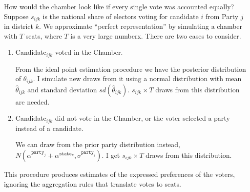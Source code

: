 How would the chamber look like if every single vote was accounted equally? Suppose $s_{ijk}$ is the national share of  electors voting for candidate $i$ from Party $j$ in district $k$.  We approximate  ``perfect representation'' by simulating a chamber with $T$ seats, where $T$ is a very large numberx. There are two cases to consider. 

\begin{enumerate}
\item Candidate$_{ijk}$ voted in the Chamber. 
  
From the ideal point estimation procedure we have the posterior distribution of $\theta_{ijk}$. I simulate new draws from it using a normal distribution with mean $\hat \theta_{ijk}$ and standard deviation $sd(\hat\theta_{ijk})$. $s_{ijk}\times T$ draws from this distribution are needed.

\item Candidate$_{ijk}$ did not vote in the Chamber, or the voter selected a party instead of a candidate. 

We can draw from the prior party distribution instead, $N(\alpha^{\mathtt{party_j}}+\alpha^{\mathtt{state}_k},\sigma^{\mathtt{party}_j})$.  I get $s_{ijk} \times T$ draws from this distribution.
\end{enumerate}

This procedure produces estimates of the expressed preferences of the voters, ignoring the aggregation rules that translate votes to seats. 


